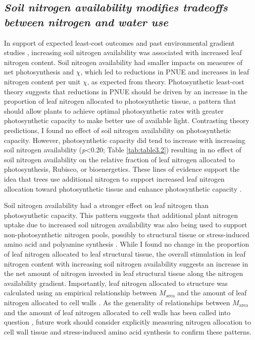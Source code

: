 \subsection{\textit{Soil nitrogen availability modifies tradeoffs between nitrogen and water use}}
\noindent In support of expected least-cost outcomes and past environmental gradient studies , increasing soil nitrogen availability was associated with increased leaf nitrogen content. Soil nitrogen availability had smaller impacts on measures of net photosynthesis and $\chi$, which led to reductions in PNUE and increases in leaf nitrogen content per unit $\chi$, as expected from theory. Photosynthetic least-cost theory suggests that reductions in PNUE should be driven by an increase in the proportion of leaf nitrogen allocated to photosynthetic tissue, a pattern that should allow plants to achieve optimal photosynthetic rates with greater photosynthetic capacity to make better use of available light. Contrasting theory predictions, I found no effect of soil nitrogen availability on photosynthetic capacity. However, photosynthetic capacity did tend to increase with increasing soil nitrogen availability (\textit{p}<0.20; Table \ref{tab:table3.2}) resulting in no effect of soil nitrogen availability on the relative fraction of leaf nitrogen allocated to photosynthesis, Rubisco, or bioenergetics. These lines of evidence support the idea that trees use additional nitrogen to support increased leaf nitrogen allocation toward photosynthetic tissue and enhance photosynthetic capacity .

Soil nitrogen availability had a stronger effect on leaf nitrogen than photosynthetic capacity. This pattern suggests that additional plant nitrogen uptake due to increased soil nitrogen availability was also being used to support non-photosynthetic nitrogen pools, possibly to structural tissue or stress-induced amino acid and polyamine synthesis . While I found no change in the proportion of leaf nitrogen allocated to leaf structural tissue, the overall stimulation in leaf nitrogen content with increasing soil nitrogen availability suggests an increase in the net amount of nitrogen invested in leaf structural tissue along the nitrogen availability gradient. Importantly, leaf nitrogen allocated to structure was calculated using an empirical relationship between $M_\mathrm{area}$ and the amount of leaf nitrogen allocated to cell walls . As the generality of relationships between $M_\mathrm{area}$ and the amount of leaf nitrogen allocated to cell walls has been called into question , future work should consider explicitly measuring nitrogen allocation to cell wall tissue and stress-induced amino acid synthesis to confirm these patterns.
    
